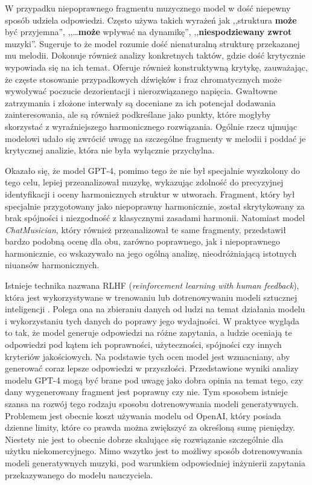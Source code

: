 \documentclass[data-science]{agh-wi} %
\begin{document}
W przypadku niepoprawnego fragmentu muzycznego model w dość niepewny sposób udziela odpowiedzi. Często używa takich wyrażeń jak ,,struktura \textbf{może} być przyjemna'', ,,\dots \textbf{może} wpływać na dynamikę'', ,,\textbf{niespodziewany zwrot} muzyki''. Sugeruje to że model rozumie dość nienaturalną strukturę przekazanej mu melodii. Dokonuje również analizy konkretnych taktów, gdzie dość krytycznie wypowiada się na ich temat. Oferuje również konstruktywną krytykę, zauważając, że częste stosowanie przypadkowych dźwięków i fraz chromatycznych może wywoływać poczucie dezorientacji i nierozwiązanego napięcia. Gwałtowne zatrzymania i złożone interwały są doceniane za ich potencjał dodawania zainteresowania, ale są również podkreślane jako punkty, które mogłyby skorzystać z wyraźniejszego harmonicznego rozwiązania. Ogólnie rzecz ujmując modelowi udało się zwrócić uwagę na szczególne fragmenty w melodii i poddać je krytycznej analizie, która nie była wyłącznie przychylna.

Okazało się, że model GPT-4, pomimo tego że nie był specjalnie wyszkolony do tego celu, lepiej przeanalizował muzykę, wykazując zdolność do precyzyjnej identyfikacji i oceny harmonicznych struktur w utworach. Fragment, który był specjalnie przygotowany jako niepoprawny harmonicznie, został skrytykowany za brak spójności i niezgodność z klasycznymi zasadami harmonii. Natomiast model \textit{ChatMusician}, który również przeanalizował te same fragmenty, przedstawił bardzo podobną ocenę dla obu, zarówno poprawnego, jak i niepoprawnego harmonicznie, co wskazywało na jego ogólną analizę, nieodróżniającą istotnych niuansów harmonicznych.

Istnieje technika nazwana RLHF (\textit{reinforcement learning with human feedback}), która jest wykorzystywane w trenowaniu lub dotrenowywaniu modeli sztucznej inteligencji \cite{rl_training}. Polega ona na zbieraniu danych od ludzi na temat działania modelu i wykorzystaniu tych danych do poprawy jego wydajności. W praktyce wygląda to tak, że model generuje odpowiedzi na różne zapytania, a ludzie oceniają te odpowiedzi pod kątem ich poprawności, użyteczności, spójności czy innych kryteriów jakościowych. Na podstawie tych ocen model jest wzmacniany, aby generować coraz lepsze odpowiedzi w przyszłości. Przedstawione wyniki analizy modelu GPT-4 mogą być brane pod uwagę jako dobra opinia na temat tego, czy dany wygenerowany fragment jest poprawny czy nie. Tym sposobem istnieje szansa na rozwój tego rodzaju sposobu dotrenowywania modeli generatywnych. Problemem jest obecnie koszt używania modelu od OpenAI, który posiada dzienne limity, które co prawda można zwiększyć za określoną sumę pieniędzy. Niestety nie jest to obecnie dobrze skalujące się rozwiązanie szczególnie dla użytku niekomercyjnego. Mimo wszytko jest to możliwy sposób dotrenowywania modeli generatywnych muzyki, pod warunkiem odpowiedniej inżynierii zapytania przekazywanego do modelu nauczyciela.
\end{document}

